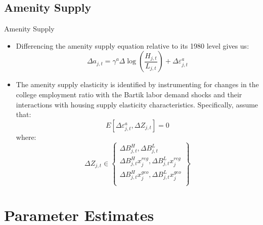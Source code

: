 \documentclass[aspectratio=169]{beamer}
\begin{document}

\subsection{Amenity Supply}


\begin{frame}{Amenity Supply}

\begin{itemize}
    \item<1-> Differencing the amenity supply equation relative to its 1980 level gives us:
    \begin{equation*}
        \Delta a_{j,t} = \gamma^{a} \Delta \log\left( \frac{H_{j,t}}{L_{j,t}} \right) + \Delta \varepsilon_{j,t}^{a}
    \end{equation*}
    \item<2-> The amenity supply elasticity is identified by instrumenting for changes in the college employment ratio with the Bartik labor demand shocks and their interactions with housing supply elasticity characteristics.  Specifically, assume that:
    \begin{equation*}
        E\left[ \Delta \varepsilon_{j,t}^{a} , \Delta Z_{j,t} \right] = 0
    \end{equation*}
    where:
    \begin{equation*}
        \Delta Z_{j,t} \in \left\{ \begin{matrix}
            \Delta B_{j,t}^{H} , \Delta B_{j,t}^{L} \\
            \Delta B_{j,t}^{H} x_{j}^{reg} , \Delta B_{j,t}^{L} x_{j}^{reg} \\
            \Delta B_{j,t}^{H} x_{j}^{geo} , \Delta B_{j,t}^{L} x_{j}^{geo} \\
        \end{matrix} \right\}
    \end{equation*}
\end{itemize}
    
\end{frame}


\section{Parameter Estimates}
\end{document}
